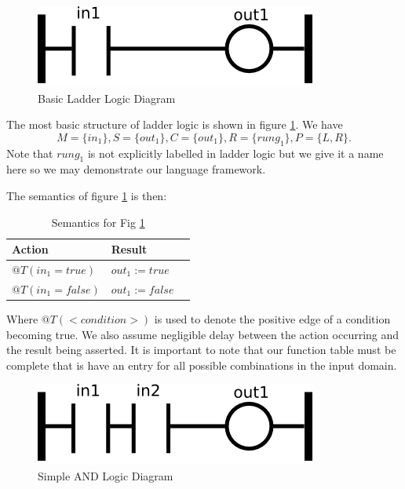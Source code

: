 \begin{figure}[htp]
    \centering
    \includegraphics[width=\imgsmall]{./images/intro_fig1.png}
    \caption{Basic Ladder Logic Diagram}
    \label{fig:intro_fig1}
\end{figure}

The most basic structure of ladder logic is shown in figure \ref{fig:intro_fig1}. 
We have 
$$M=\lbrace in_1 \rbrace, S=\lbrace out_1 \rbrace, C=\lbrace out_1 \rbrace, R=\lbrace rung_1 \rbrace, P=\lbrace L,R \rbrace.$$
Note that $rung_1$ is not explicitly labelled in ladder logic but we give it a name here
so we may demonstrate our language framework.

The semantics of figure \ref{fig:intro_fig1} is then: 
\begin{table}[htp]
    \centering
    \begin{tabular}{|l|l|l|}
        \hline
        Action & Result \\
        \hline
        $@T(in_1 = true)$ & $out_1 := true$ \\
        \hline
        $@T(in_1 = false)$ & $out_1 := false$ \\
        \hline
    \end{tabular}
    \caption{Semantics for Fig \ref{fig:intro_fig1}}
    \label{table:table_for_fig1}
\end{table}


Where $@T(<condition>)$ is used to denote the positive edge of a condition becoming true.
We also assume negligible delay between the action occurring and the result being asserted.
It is important to note that our function table must be complete that is have an entry for
all possible combinations in the input domain.

\begin{figure}[htp]
    \centering
    \includegraphics[width=\imgsmall]{./images/intro_fig2.png}
    \caption{Simple AND Logic Diagram}
    \label{fig:intro_fig2}
\end{figure}

